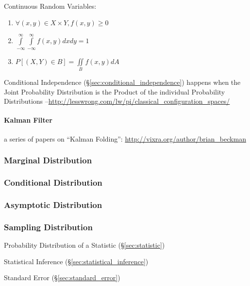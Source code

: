 Continuous Random Variables:
\begin{enumerate}
  \item $\forall (x,y) \in X \times Y, f(x,y) \geq 0$
  \item $\int\limits_{-\infty}^{\infty} \int\limits_{-\infty}^{\infty}
    f(x,y) dx dy = 1$
  \item $P[(X,Y) \in B] = \iint\limits_B f(x,y) dA$
\end{enumerate}

Conditional Independence (\S\ref{sec:conditional_independence}) happens when
the Joint Probability Distribution is the Product of the individual Probability
Distributions
--\url{http://lesswrong.com/lw/pi/classical_configuration_spaces/}



\paragraph{Kalman Filter}\label{sec:kalman_filter}\hfill

a series of papers on ``Kalman Folding'':
\url{http://vixra.org/author/brian_beckman}



\subsubsection{Marginal Distribution}\label{sec:marginal_distribution}

\subsubsection{Conditional Distribution}
\label{sec:conditional_distribution}

\subsubsection{Asymptotic Distribution}
\label{sec:asymptotic_distribution}

\subsubsection{Sampling Distribution}\label{sec:sampling_distribution}

Probability Distribution of a Statistic (\S\ref{sec:statistic})

Statistical Inference (\S\ref{sec:statistical_inference})

Standard Error (\S\ref{sec:standard_error})



